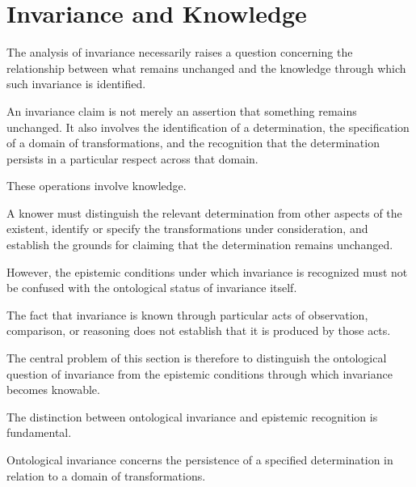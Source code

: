

\section{Invariance and Knowledge}
\label{sec:invariance-and-knowledge}


The analysis of invariance necessarily raises
a question concerning the relationship between
what remains unchanged and the knowledge through
which such invariance is identified.

An invariance claim is not merely an assertion
that something remains unchanged. It also
involves the identification of a determination,
the specification of a domain of transformations,
and the recognition that the determination
persists in a particular respect across that
domain.

These operations involve knowledge.

A knower must distinguish the relevant
determination from other aspects of the
existent, identify or specify the transformations
under consideration, and establish the grounds
for claiming that the determination remains
unchanged.

However, the epistemic conditions under which
invariance is recognized must not be confused
with the ontological status of invariance itself.

The fact that invariance is known through
particular acts of observation, comparison,
or reasoning does not establish that it is
produced by those acts.

The central problem of this section is
therefore to distinguish the ontological
question of invariance from the epistemic
conditions through which invariance becomes
knowable.


The distinction between ontological invariance
and epistemic recognition is fundamental.

Ontological invariance concerns the persistence
of a specified determination in relation to
a domain of transformations.

